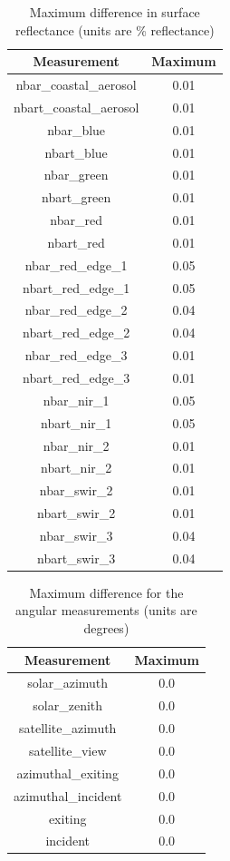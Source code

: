 \documentclass[a4paper]{article}
\begin{document}
    \begin{table}[ht!]
      \caption{Maximum difference in surface reflectance (units are \% reflectance)}\label{table:2}
      \centering
      \begin{tabular}{cc} \midrule
        \textbf{Measurement} & \textbf{Maximum} \\ \midrule
        nbar\_coastal\_aerosol & 0.01 \\
        nbart\_coastal\_aerosol & 0.01 \\
        nbar\_blue & 0.01 \\
        nbart\_blue & 0.01 \\
        nbar\_green & 0.01 \\
        nbart\_green & 0.01 \\
        nbar\_red & 0.01 \\
        nbart\_red & 0.01 \\
        nbar\_red\_edge\_1 & 0.05 \\
        nbart\_red\_edge\_1 & 0.05 \\
        nbar\_red\_edge\_2 & 0.04 \\
        nbart\_red\_edge\_2 & 0.04 \\
        nbar\_red\_edge\_3 & 0.01 \\
        nbart\_red\_edge\_3 & 0.01 \\
        nbar\_nir\_1 & 0.05 \\
        nbart\_nir\_1 & 0.05 \\
        nbar\_nir\_2 & 0.01 \\
        nbart\_nir\_2 & 0.01 \\
        nbar\_swir\_2 & 0.01 \\
        nbart\_swir\_2 & 0.01 \\
        nbar\_swir\_3 & 0.04 \\
        nbart\_swir\_3 & 0.04 \\ \midrule
      \end{tabular}
    \end{table}

  \newpage

    \begin{table}[ht!]
      \caption{Maximum difference for the angular measurements (units are degrees)}\label{table:3}
      \centering
      \begin{tabular}{cc} \midrule
        \textbf{Measurement} & \textbf{Maximum} \\ \midrule
        solar\_azimuth & 0.0 \\
        solar\_zenith & 0.0 \\
        satellite\_azimuth & 0.0 \\
        satellite\_view & 0.0 \\
        azimuthal\_exiting & 0.0 \\
        azimuthal\_incident & 0.0 \\
        exiting & 0.0 \\
        incident & 0.0 \\ \midrule
      \end{tabular}
    \end{table}
\end{document}
